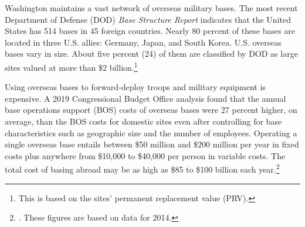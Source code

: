 Washington maintains a vast network of overseas military bases. %
The most recent Department of Defense (DOD) \textit{Base Structure Report} indicates that the United States has 514 bases in 45 foreign countries.\autocite[7]{BSR18} Nearly 80 percent of these bases are located in three U.S. allies: Germany, Japan, and South Korea. U.S. overseas bases vary in size. About five percent (24) of them are classified by DOD as large sites valued at more than \$2 billion.\footnote{This is based on the sites' permanent replacement value (PRV).} %



Using overseas bases to forward-deploy troops and military equipment is expensive. A 2019 Congressional Budget Office analysis found that the annual base operations support (BOS) costs of overseas bases were 27 percent higher, on average, than the BOS costs for domestic sites even after controlling for base characteristics such as geographic size and the number of employees.\autocite[11]{cbo201911} Operating a single overseas base entails between \$50 million and \$200 million per year in fixed costs plus anywhere from \$10,000 to \$40,000 per person in variable costs.\autocite[xxv]{randoverseas13} The total cost of basing abroad may be as high as \$85 to \$100 billion each year.\footnote{\cite{vinebase15}. These figures are based on data for 2014.} %

